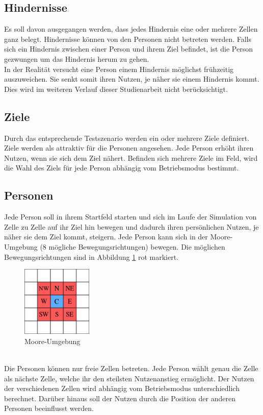 \subsection{Hindernisse}
Es soll davon ausgegangen werden, dass jedes Hindernis eine oder mehrere Zellen ganz belegt. Hindernisse können von den Personen nicht betreten werden. Falls sich ein Hindernis zwischen einer Person und ihrem Ziel befindet, ist die Person gezwungen um das Hindernis herum zu gehen. \\
In der Realität versucht eine Person einem Hindernis möglichst frühzeitig auszuweichen. Sie senkt somit ihren Nutzen, je näher sie einem Hindernis kommt. Dies wird im weiteren Verlauf dieser Studienarbeit nicht berücksichtigt.

\subsection{Ziele}
Durch das entsprechende Testszenario werden ein oder mehrere Ziele definiert. Ziele werden als attraktiv für die Personen angesehen. Jede Person erhöht ihren Nutzen, wenn sie sich dem Ziel nähert. Befinden sich mehrere Ziele im Feld, wird die Wahl des Ziels für jede Person abhängig vom Betriebsmodus bestimmt. 

\subsection{Personen}
Jede Person soll in ihrem Startfeld starten und sich im Laufe der Simulation von Zelle zu Zelle auf ihr Ziel hin bewegen und dadurch ihren persönlichen Nutzen, je näher sie dem Ziel kommt, steigern. Jede Person kann sich in der Moore-Umgebung (8 mögliche Bewegungsrichtungen) bewegen. Die möglichen Bewegungsrichtungen sind in Abbildung \ref{fig:MooreUmgebung} rot markiert.
\begin{figure}[htpb]
	\centering
	\includegraphics[width=0.3\textwidth]{abbildungen/MooreUmgebung.pdf}
	\caption{Moore-Umgebung}
	\label{fig:MooreUmgebung}
\end{figure}
\\
Die Personen können nur freie Zellen betreten. Jede Person wählt genau die Zelle als nächste Zelle, welche ihr den steilsten Nutzenanstieg ermöglicht. Der Nutzen der verschiedenen Zellen wird abhängig vom Betriebsmodus unterschiedlich berechnet. Darüber hinaus soll der Nutzen durch die Position der anderen Personen beeinflusst werden. \\

